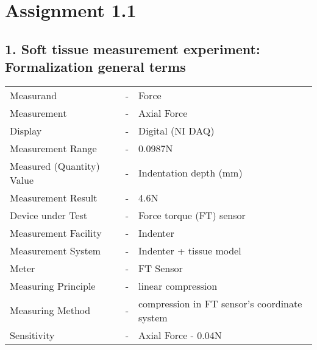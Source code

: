 \section*{Assignment 1.1}

\subsection*{1. Soft tissue measurement experiment: Formalization general terms}
\begin{table}[ht]
\centering
\begin{tabular}{lcl}
Measurand &-& Force \\
Measurement &-& Axial Force\\
Display &-& Digital (NI DAQ) \\
Measurement Range &-& 0.0987N \\
Measured (Quantity) Value &-& Indentation depth (mm)\\
Measurement Result &-& 4.6N \\
Device under Test &-& Force torque (FT) sensor \\
Measurement Facility &-& Indenter \\
Measurement System &-& Indenter + tissue model \\
Meter &-& FT Sensor \\
Measuring Principle &-& linear compression \\
Measuring Method &-& compression in FT sensor's coordinate system \\
Sensitivity &-& Axial Force - 0.04N \\
\end{tabular}
\end{table}

